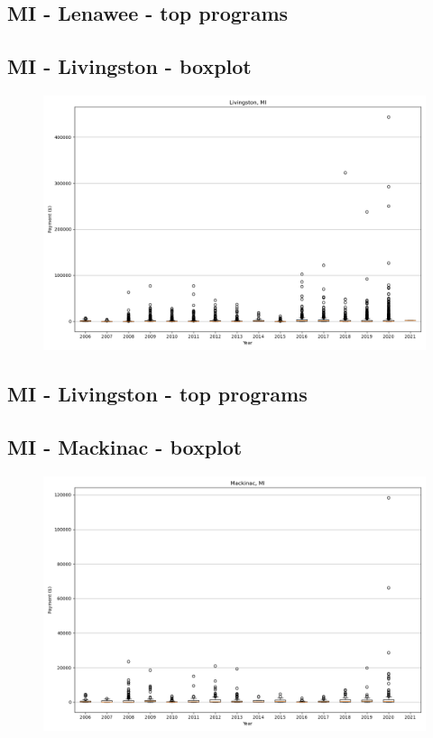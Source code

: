 \subsection*{MI - Lenawee - top programs}

\newpage
\subsection*{MI - Livingston - boxplot}
\begin{figure}[h]
\centering
\includegraphics[width=7in]{../output/boxplots/counties/Livingston-MI_boxplot.png}
\end{figure}


\subsection*{MI - Livingston - top programs}

\newpage
\subsection*{MI - Mackinac - boxplot}
\begin{figure}[h]
\centering
\includegraphics[width=7in]{../output/boxplots/counties/Mackinac-MI_boxplot.png}
\end{figure}


